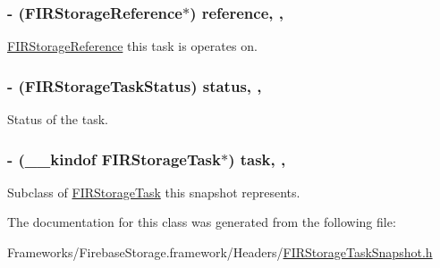 \subsubsection[{reference}]{\setlength{\rightskip}{0pt plus 5cm}-\/ ({\bf F\+I\+R\+Storage\+Reference}$\ast$) reference\hspace{0.3cm}{\ttfamily [read]}, {\ttfamily [nonatomic]}, {\ttfamily [copy]}}\label{interface_f_i_r_storage_task_snapshot_a475feffa15b89b28043356a36efeefa6}
\hyperlink{interface_f_i_r_storage_reference}{F\+I\+R\+Storage\+Reference} this task is operates on. \hypertarget{interface_f_i_r_storage_task_snapshot_a9c558313c12d53012cc7a31bbd927262}{}
\subsubsection[{status}]{\setlength{\rightskip}{0pt plus 5cm}-\/ (F\+I\+R\+Storage\+Task\+Status) status\hspace{0.3cm}{\ttfamily [read]}, {\ttfamily [nonatomic]}, {\ttfamily [assign]}}\label{interface_f_i_r_storage_task_snapshot_a9c558313c12d53012cc7a31bbd927262}
Status of the task. \hypertarget{interface_f_i_r_storage_task_snapshot_a77fe9c6a0a95cbcc38b8efa358d0b4f6}{}
\subsubsection[{task}]{\setlength{\rightskip}{0pt plus 5cm}-\/ (\+\_\+\+\_\+kindof {\bf F\+I\+R\+Storage\+Task}$\ast$) task\hspace{0.3cm}{\ttfamily [read]}, {\ttfamily [nonatomic]}, {\ttfamily [copy]}}\label{interface_f_i_r_storage_task_snapshot_a77fe9c6a0a95cbcc38b8efa358d0b4f6}
Subclass of \hyperlink{interface_f_i_r_storage_task}{F\+I\+R\+Storage\+Task} this snapshot represents. 

The documentation for this class was generated from the following file\+:\begin{DoxyCompactItemize}
\item 
Frameworks/\+Firebase\+Storage.\+framework/\+Headers/\hyperlink{_f_i_r_storage_task_snapshot_8h}{F\+I\+R\+Storage\+Task\+Snapshot.\+h}\end{DoxyCompactItemize}

